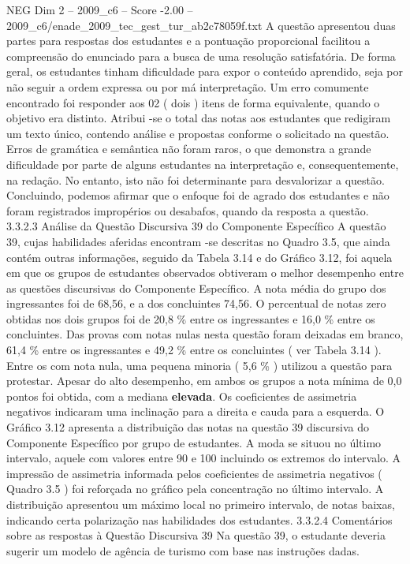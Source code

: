 \begin{textsample}{NEG Dim 2 – 2009\_c6 – Score -2.00 – 2009\_c6/enade\_2009\_tec\_gest\_tur\_ab2c78059f.txt}
A questão apresentou duas partes para respostas dos estudantes e a pontuação proporcional facilitou a compreensão do enunciado para a busca de uma resolução satisfatória.
De forma geral, os estudantes tinham dificuldade para expor o conteúdo aprendido, seja por não seguir a ordem expressa ou por má interpretação.
Um erro comumente encontrado foi responder aos 02 ( dois ) itens de forma equivalente, quando o objetivo era distinto.
Atribui -se o total das notas aos estudantes que redigiram um texto único, contendo análise e propostas conforme o solicitado na questão.
Erros de gramática e semântica não foram raros, o que demonstra a grande dificuldade por parte de alguns estudantes na interpretação e, consequentemente, na redação.
No entanto, isto não foi determinante para desvalorizar a questão.
Concluindo, podemos afirmar que o enfoque foi de agrado dos estudantes e não foram registrados impropérios ou desabafos, quando da resposta a questão. 3.3.2.3 Análise da Questão Discursiva 39 do Componente Específico A questão 39, cujas habilidades aferidas encontram -se descritas no Quadro 3.5, que ainda contém outras informações, seguido da Tabela 3.14 e do Gráfico 3.12, foi aquela em que os grupos de estudantes observados obtiveram o melhor desempenho entre as questões discursivas do Componente Específico.
A nota média do grupo dos ingressantes foi de 68,56, e a dos concluintes 74,56.
O percentual de notas zero obtidas nos dois grupos foi de 20,8 \% entre os ingressantes e 16,0 \% entre os concluintes.
Das provas com notas nulas nesta questão foram deixadas em branco, 61,4 \% entre os ingressantes e 49,2 \% entre os concluintes ( ver Tabela 3.14 ).
Entre os com nota nula, uma pequena minoria ( 5,6 \% ) utilizou a questão para protestar.
Apesar do alto desempenho, em ambos os grupos a nota mínima de 0,0 pontos foi obtida, com a mediana \textbf{elevada}.
Os coeficientes de assimetria negativos indicaram uma inclinação para a direita e cauda para a esquerda.
O Gráfico 3.12 apresenta a distribuição das notas na questão 39 discursiva do Componente Específico por grupo de estudantes.
A moda se situou no último intervalo, aquele com valores entre 90 e 100 incluindo os extremos do intervalo.
A impressão de assimetria informada pelos coeficientes de assimetria negativos ( Quadro 3.5 ) foi reforçada no gráfico pela concentração no último intervalo.
A distribuição apresentou um máximo local no primeiro intervalo, de notas baixas, indicando certa polarização nas habilidades dos estudantes. 3.3.2.4 Comentários sobre as respostas à Questão Discursiva 39 Na questão 39, o estudante deveria sugerir um modelo de agência de turismo com base nas instruções dadas.

\end{textsample}
